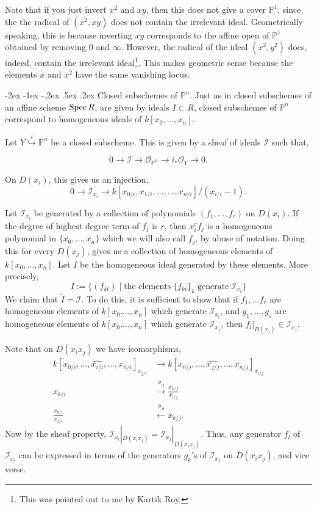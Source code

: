 \documentclass[11pt]{amsart}
\makeatletter
\renewcommand\subsection{\@startsection {subsection}{1}{\z@}%
	{-2ex \@plus -1ex \@minus -.2ex}%
	{.5ex \@plus.2ex}%
	{\normalfont\bfseries}}
\newcommand{\Spec}{{\rm Spec \,}}
\renewcommand{\tilde}{\widetilde}
\newcommand{\sI}{{\mathcal I}}
\newcommand{\sO}{{\mathcal O}}
\renewcommand{\P}{{\mathbb P}}
\theoremstyle{definition}
\makeatother
\begin{document}
Note that if you just invert $x^2$ and $xy$, then this does not give a cover $\P^1$, since the the radical of $(x^2,xy)$ does not contain the irrelevant ideal. Geometrically speaking, this is because inverting $xy$ corresponds to the affine open of $\P^1$ obtained by removing $0$ and $\infty$. However, the radical of the ideal $(x^2,y^2)$ does, indeed, contain the irrelevant ideal\footnote{This was pointed out to me by Kartik Roy.}. This makes geometric sense because the elements $x$ and $x^2$ have the same vanishing locus.

\subsection{Closed subschemes of \texorpdfstring{$\P^n$}{Pn}.}
\label{subsection-closed-in-proj}
Just as in closed subschemes of an affine scheme $\Spec R$, are given by ideals $I\subset R$, closed subschemes of $\P^n$ correspond to homogeneous ideals of $k[x_0,\ldots,x_n]$.

Let $Y\overset{i}{\hookrightarrow} \P^n$ be a closed subscheme. This is given by a sheaf of ideals $\sI$ such that,

\[0\rightarrow \sI\rightarrow \sO_{\P^n}\rightarrow i_*\sO_Y\rightarrow 0.\]

On $D(x_i)$, this gives us an injection,
\[0\rightarrow \sI_{x_i}\rightarrow k[x_{0/i},x_{1/i},\ldots,\ldots,x_{n/i}]/(x_{i/i}-1). \]

Let $\sI_{x_i}$ be generated by a collection of polynomials $(f_1,\ldots,f_r)$ on $D(x_i)$. If the degree of highest degree term of $f_j$ is $r$, then $x_i^rf_j$ is a homogeneous polynomial in $\lbrace x_0,\ldots,x_n\rbrace$ which we will also call $f_j$, by abuse of notation. Doing this for every $D(x_j)$, gives us a collection of homogeneous elements of $k[x_0,\ldots,x_n]$. Let $I$ be the homogeneous ideal generated by these elements. More precisely,
\[I:=\lbrace (f_{kl})\;|\; \text{the elements}\; \lbrace f_{ki}\rbrace_k\; \text{generate}\; \sI_{x_i}\rbrace\]
We claim that $\tilde{I}=\sI$. To do this, it is sufficient to show that if $f_1,\ldots f_r$ are homogeneous elements of $k[x_0.\ldots,x_n]$ which generate $\sI_{x_i}$, and $g_1,\ldots,g_s$ are homogeneous elements of $k[x_0.\ldots,x_n]$ which generate $\sI_{x_j}$, then $f_l|_{D(x_j)}\in \sI_{x_j}$.

Note that on $D(x_i x_j)$ we have isomorphisms,
\begin{align*}
k[x_{0/i},\ldots,\widehat{x_{i/i}},\ldots,x_{n/i}]_{x_{j/i}} &\rightarrow k[x_{0/j},\ldots,\widehat{x_{j/j}},\ldots,x_{n/j}]_{x_{i/j}}\\
x_{k/i} &\overset{\phi_{ij}}{\longrightarrow} \frac{x_{k/j}}{x_{i/j}}\\
\frac{x_{k/i}}{x_{j/i}} &\overset{\phi_{ji}}{\longleftarrow} x_{k/j}.
\end{align*}
Now by the sheaf property, $\sI_{x_i}|_{D(x_i x_j)}=\sI_{x_j}|_{D(x_i x_j)}$. Thus, any generator $f_l$ of $\sI_{x_i}$ can be expressed in terms of the generators $g_k$'s of $\sI_{x_j}$ on $D(x_i x_j)$, and vice verse.
\end{document}
